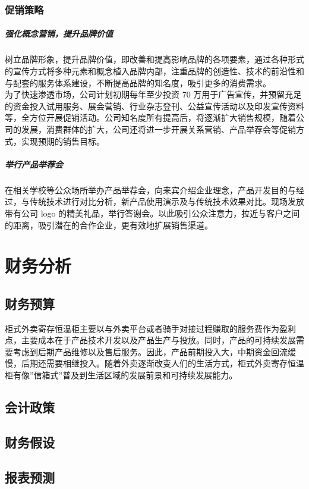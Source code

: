 \documentclass[violet]{main}
\begin{document}
			\subsection{促销策略}
				\paragraph{强化概念营销，提升品牌价值}
					树立品牌形象，提升品牌价值，即改善和提高影响品牌的各项要素，通过各种形式的宣传方式将多种元素和概念植入品牌内部，注重品牌的创造性、技术的前沿性和与配套的服务体系建设，不断提高品牌的知名度，吸引更多的消费需求。 
					\\\indent 为了快速渗透市场，公司计划初期每年至少投资 70 万用于广告宣传，并预留充足的资金投入试用服务、展会营销、行业杂志登刊、公益宣传活动以及印发宣传资料等，全方位开展促销活动。公司知名度所有提高后，将逐渐扩大销售规模，随着公司的发展，消费群体的扩大，公司还将进一步开展关系营销、产品举荐会等促销方式，实现预期的销售目标。 
				\paragraph{举行产品举荐会}
					在相关学校等公众场所举办产品举荐会，向来宾介绍企业理念，产品开发目的与经过，与传统技术进行对比分析，新产品使用演示及与传统技术效果对比。现场发放带有公司 logo 的精美礼品，举行答谢会。以此吸引公众注意力，拉近与客户之间的距离，吸引潜在的合作企业，更有效地扩展销售渠道。
	\chapter{财务分析}
		\section{财务预算}
			柜式外卖寄存恒温柜主要以与外卖平台或者骑手对接过程赚取的服务费作为盈利点，主要成本在于产品技术开发以及产品生产与投放。同时，产品的可持续发展需要考虑到后期产品维修以及售后服务。因此，产品前期投入大，中期资金回流缓慢，后期还需要相继投入。随着外卖逐渐改变人们的生活方式，柜式外卖寄存恒温柜有像''信箱式''普及到生活区域的发展前景和可持续发展能力。
		\section{会计政策}
		\section{财务假设}
		\section{报表预测}
\end{document}
